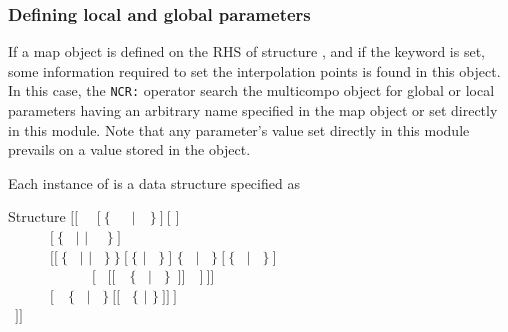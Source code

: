 \subsubsection{Defining local and global parameters}\label{sect:descintf}

\vskip -0.5cm

If a {\sc map} object is defined on the RHS of structure , and if the  keyword is set, some information required to set the interpolation points is found in this object. In this case, the {\tt NCR:} operator search the {\sc multicompo} object for global or local parameters  having an arbitrary name specified in the {\sc map} object or set directly in  this module. Note that any parameter's value set directly in this module prevails on a value stored in the  object.

Each instance of  is a data structure specified as

\begin{DataStructure}{Structure }
$[[$~ ~$[~\{$~~~$|$~~$\}~]~[$  $]$ \\
~~~~~~$[~\{$~ $|$  $|$ ~~$\}~]$ \\
~~~~~~$[[~\{$~ $|$  $|$ ~$\}~\}~[~\{$  $|$ ~$\}~]$  $\{$~ $|$ ~$\}~[~\{$~ $|$ ~$\}~]$ \\
~~~~~~~~~~~~$[$~ $[[$~~$\{$~ $|$ ~$\}$~$]]$~~$]~]]$  \\
~~~~~~$[$~~$\{$~ $|$ ~$\}~[[$~ $\{$  $|$ \moc{*} $\}~]]~]$ \\
~$]]$
\end{DataStructure}

